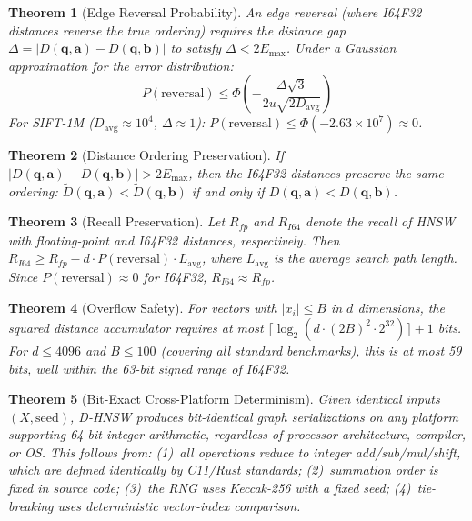 \documentclass[10pt,journal,compsoc]{IEEEtran}
\newtheorem{theorem}{Theorem}
\newcommand{\dhnsw}{\textsc{D-HNSW}}
\newcommand{\hnsw}{\textsc{HNSW}}
\begin{document}
\begin{theorem}[Edge Reversal Probability]
\label{thm:edge_reversal}
An edge reversal (where I64F32 distances reverse the true ordering) requires the distance gap $\Delta = |D(\mathbf{q}, \mathbf{a}) - D(\mathbf{q}, \mathbf{b})|$ to satisfy $\Delta < 2E_{\max}$. Under a Gaussian approximation for the error distribution:
\begin{equation}
  P(\text{reversal}) \leq \Phi\!\left(-\frac{\Delta\sqrt{3}}{2u\sqrt{2D_{\text{avg}}}}\right)
\end{equation}
For SIFT-1M ($D_{\text{avg}} \approx 10^4$, $\Delta \approx 1$): $P(\text{reversal}) \leq \Phi(-2.63 \times 10^7) \approx 0$.
\end{theorem}

\begin{theorem}[Distance Ordering Preservation]
\label{thm:order_pres}
If $|D(\mathbf{q}, \mathbf{a}) - D(\mathbf{q}, \mathbf{b})| > 2E_{\max}$, then the I64F32 distances preserve the same ordering: $\tilde{D}(\mathbf{q}, \mathbf{a}) < \tilde{D}(\mathbf{q}, \mathbf{b})$ if and only if $D(\mathbf{q}, \mathbf{a}) < D(\mathbf{q}, \mathbf{b})$.
\end{theorem}

\begin{theorem}[Recall Preservation]
\label{thm:recall_pres}
Let $R_{fp}$ and $R_{I64}$ denote the recall of \hnsw{} with floating-point and I64F32 distances, respectively. Then $R_{I64} \geq R_{fp} - d \cdot P(\text{reversal}) \cdot L_{\text{avg}}$, where $L_{\text{avg}}$ is the average search path length. Since $P(\text{reversal}) \approx 0$ for I64F32, $R_{I64} \approx R_{fp}$.
\end{theorem}

\begin{theorem}[Overflow Safety]
\label{thm:overflow}
For vectors with $|x_i| \leq B$ in $d$ dimensions, the squared distance accumulator requires at most $\lceil\log_2(d \cdot (2B)^2 \cdot 2^{32})\rceil + 1$ bits. For $d \leq 4096$ and $B \leq 100$ (covering all standard benchmarks), this is at most 59 bits, well within the 63-bit signed range of I64F32.
\end{theorem}

\begin{theorem}[Bit-Exact Cross-Platform Determinism]
\label{thm:crossplatform}
Given identical inputs $(X, \text{seed})$, \dhnsw{} produces bit-identical graph serializations on any platform supporting 64-bit integer arithmetic, regardless of processor architecture, compiler, or OS. This follows from: (1)~all operations reduce to integer add/sub/mul/shift, which are defined identically by C11/Rust standards; (2)~summation order is fixed in source code; (3)~the RNG uses Keccak-256 with a fixed seed; (4)~tie-breaking uses deterministic vector-index comparison.
\end{theorem}
\end{document}
